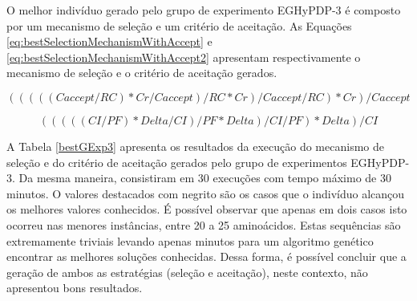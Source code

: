 	O melhor indivíduo gerado pelo grupo de experimento EGHyPDP-3 é composto por um mecanismo de seleção e um critério de aceitação. As Equações \ref{eq:bestSelectionMechanismWithAccept} e \ref{eq:bestSelectionMechanismWithAccept2} apresentam respectivamente o mecanismo de seleção e o critério de aceitação gerados.
	
	
	\begin{equation}
	\label{eq:bestSelectionMechanismWithAccept}
	( ( ( ( ( Caccept / RC ) * Cr / Caccept ) / RC * Cr ) / Caccept / RC ) * Cr ) / Caccept 
	\end{equation}
	
	
	\begin{equation}
	\label{eq:bestSelectionMechanismWithAccept2}
( ( ( ( ( CI / PF ) * Delta / CI ) / PF * Delta ) / CI / PF ) * Delta ) / CI
	\end{equation}
	
	
	A Tabela \ref{bestGExp3} apresenta os resultados da execução do mecanismo de seleção e do critério de aceitação gerados pelo grupo de experimentos EGHyPDP-3. Da mesma maneira, consistiram em 30 execuções com tempo máximo de 30 minutos. O valores destacados com negrito são os casos que o indivíduo alcançou os melhores valores conhecidos. É possível observar que apenas em dois casos isto ocorreu nas menores instâncias, entre 20 a 25 aminoácidos. Estas sequências são extremamente triviais levando apenas minutos para um  algoritmo genético encontrar as melhores soluções conhecidas. Dessa forma, é possível concluir que a geração de ambos as estratégias (seleção e aceitação), neste contexto, não apresentou bons resultados. 
	
	\begin{table}[]
		\centering
		\caption{Resultados da execução do melhor indivíduo encontrado no grupo de experimento EGHyPDP-3}
		\label{bestGExp3}
	\end{table}
	
